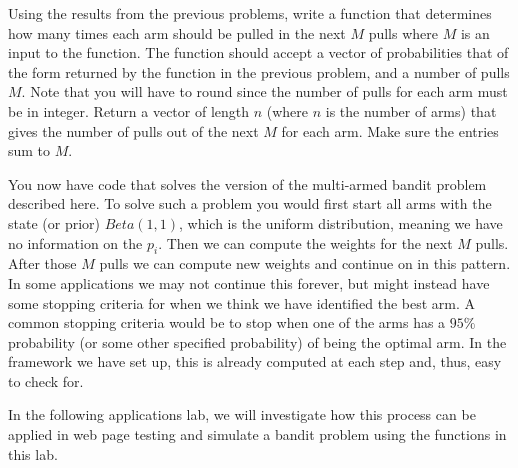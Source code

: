\begin{problem}
Using the results from the previous problems, write a function that determines how many times each arm should be pulled in the next $M$ pulls where $M$ is an input to the function.  The function should accept a vector of probabilities that of the form returned by the function in the previous problem, and a number of pulls $M$.  Note that you will have to round since the number of pulls for each arm must be in integer.  Return a vector of length $n$ (where $n$ is the number of arms) that gives the number of pulls out of the next $M$ for each arm.  Make sure the entries sum to $M$.
\end{problem}

You now have code that solves the version of the multi-armed bandit problem described here.  To solve such a problem you would first start all arms with the state (or prior) $Beta(1,1)$, which is the uniform distribution, meaning we have no information on the $p_i$.  Then we can compute the weights for the next $M$ pulls.  After those $M$ pulls we can compute new weights and continue on in this pattern.  In some applications we may not continue this forever, but might instead have some stopping criteria for when we think we have identified the best arm.  A common stopping criteria would be to stop when one of the arms has a $95\%$ probability (or some other specified probability) of being the optimal arm.  In the framework we have set up, this is already computed at each step and, thus, easy to check for.

In the following applications lab, we will investigate how this process can be applied in web page testing and simulate a bandit problem using the functions in this lab. 
